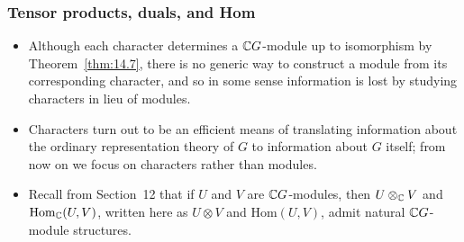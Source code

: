 \documentclass[../Odyssey_Project.tex]{subfiles}
\begin{document}
\subsubsection*{Tensor products, duals, and Hom}
\begin{itemize}
    \item Although each character determines a $\mathbb{C} G$-module up to isomorphism by Theorem~\ref{thm:14.7}, there is no generic way to construct a module from its corresponding character, and so in some sense information is lost by studying characters in lieu of modules.
    \item Characters turn out to be an efficient means of translating information about the ordinary representation theory of $G$ to information about $G$ itself; from now on we focus on characters rather than modules.
    \item Recall from Section~12 that if $U$ and $V$ are $\mathbb{C} G$-modules, then $U \otimes_{\mathbb{C}} V$ and $\mathrm{Hom}_{\mathbb{C}}(U,V)$, written here as $U \otimes V$ and $\mathrm{Hom}(U,V)$, admit natural $\mathbb{C} G$-module structures.
\end{itemize}
\end{document}

